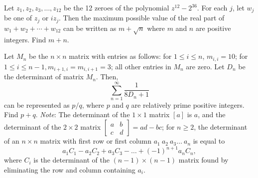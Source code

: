 \documentclass[11pt]{article}
\theoremstyle{definition}
\begin{document}
\begin{question}[name={2011 AIME II, \href{https://artofproblemsolving.com/community/c4p2224415}{Problem 8}}]
	Let $z_1,z_2,z_3,\dots,z_{12}$ be the 12 zeroes of the polynomial $z^{12}-2^{36}$. For each $j$, let $w_j$ be one of $z_j$ or $i z_j$. Then the maximum possible value of the real part of $w_1+w_2+\cdots+w_{12}$ can be written as $m+\sqrt{n}$ where $m$ and $n$ are positive integers. Find $m+n$.	
	
\end{question}


%	














\begin{question}[name={2011 AIME II, \href{https://artofproblemsolving.com/community/c4p2224432}{Problem 11}}]
	Let $M_n$ be the $n\times n$ matrix with entries as follows: for $1\leq i \leq n$, $m_{i,i}=10$; for $1\leq i \leq n-1, m_{i+1,i}=m_{i,i+1}=3$; all other entries in $M_n$ are zero. Let $D_n$ be the determinant of matrix $M_n$. Then, $$\displaystyle \sum_{n=1}^{\infty} \dfrac{1}{8D_n+1}$$ can be represented as ${p}/{q}$, where $p$ and $q$ are relatively prime positive integers. Find $p+q$. \textit{Note}: The determinant of the $1\times 1$ matrix $[a]$ is $a$, and the determinant of the $2\times 2$ matrix $\left[ \begin{array}{cc} a & b \\ c & d \end{array} \right]=ad-bc$; for $n\geq 2$, the determinant of an $n\times n$ matrix with first row or first column $a_1\ a_2\ a_3 \dots\ a_n$ is equal to $$a_1C_1 - a_2C_2 + a_3C_3 - \dots + (-1)^{n+1} a_nC_n,$$ where $C_i$ is the determinant of the $(n-1)\times (n-1)$ matrix found by eliminating the row and column containing $a_i$.
\end{question}


%	
\end{document}
